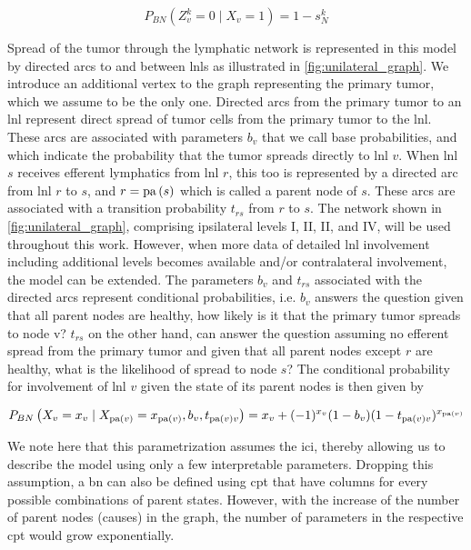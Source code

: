 \documentclass[../ms.tex]{subfiles}
\begin{document}
\begin{equation}
    P_{BN} \left( Z_v^k = 0 \mid X_v = 1 \right) = 1 - s_N^k
\end{equation}

Spread of the tumor through the lymphatic network is represented in this model by directed arcs to and between \glspl{lnl} as illustrated in \cref{fig:unilateral_graph}. We introduce an additional vertex to the graph representing the primary tumor, which we assume to be the only one. Directed arcs from the primary tumor to an \gls{lnl} represent direct spread of tumor cells from the primary tumor to the \gls{lnl}. These arcs are associated with parameters $b_v$ that we call base probabilities, and which indicate the probability that the tumor spreads directly to \gls{lnl} $v$. When \gls{lnl} $s$ receives efferent lymphatics from \gls{lnl} $r$, this too is represented by a directed arc from \gls{lnl} $r$ to $s$, and $r=\operatorname{pa}{(s)}$ which is called a parent node of $s$. These arcs are associated with a transition probability $t_{rs}$ from $r$ to $s$. The network shown in \cref{fig:unilateral_graph}, comprising ipsilateral levels I, II, II, and IV, will be used throughout this work. However, when more data of detailed \gls{lnl} involvement including additional levels becomes available and/or contralateral involvement, the model can be extended.
The parameters $b_v$ and $t_{rs}$   associated with the directed arcs represent conditional probabilities, i.e. $b_v$ answers the question given that all parent nodes are healthy, how likely is it that the primary tumor spreads to node v? $t_{rs}$   on the other hand, can answer the question assuming no efferent spread from the primary tumor and given that all parent nodes except $r$ are healthy, what is the likelihood of spread to node $s$? The conditional probability for involvement of \gls{lnl} $v$ given the state of its parent nodes is then given by

\begin{equation}
    \begin{aligned}
        P_{BN} \left( X_v = x_v \mid X_{\operatorname{pa}(v)} = x_{\operatorname{pa}(v)}, b_v, t_{\operatorname{pa}(v)v} \right) = x_v + (-1)^{x_v} (1 - b_v) (1 - t_{\operatorname{pa}(v)v})^{x_{\operatorname{pa}(v)}}
    \end{aligned}
\end{equation}

We note here that this parametrization assumes the \gls{ici}, thereby allowing us to describe the model using only a few interpretable parameters. Dropping this assumption, a \gls{bn} can also be defined using \gls{cpt} that have columns for every possible combinations of parent states. However, with the increase of the number of parent nodes (causes) in the graph, the number of parameters in the respective \gls{cpt} would grow exponentially.
\end{document}
